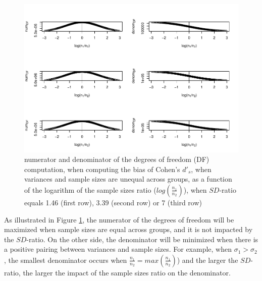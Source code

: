 \documentclass[
  man]{apa6}
\begin{document}
\begin{figure}
\centering
\includegraphics{Theoretical-Bias-of-all-estimators-as-a-function-of-population-parameters_files/figure-latex/biascohendprimehetunbalnumanddenomdf-1.pdf}
\caption{\label{fig:biascohendprimehetunbalnumanddenomdf}numerator and denominator of the degrees of freedom (DF) computation, when computing the bias of Cohen's \(d'_s\), when variances and sample sizes are unequal across groups, as a function of the logarithm of the sample sizes ratio (\(log \left( \frac{n_1}{n_2} \right)\)), when \(SD\)-ratio equals 1.46 (first row), 3.39 (second row) or 7 (third row)}
\end{figure}

As illustrated in Figure \ref{fig:biascohendprimehetunbalnumanddenomdf}, the numerator of the degrees of freedom will be maximized when sample sizes are equal across groups, and it is not impacted by the \(SD\)-ratio. On the other side, the denominator will be minimized when there is a positive pairing between variances and sample sizes. For example, when \(\sigma_1>\sigma_2\), the smallest denominator occurs when \(\frac{n_1}{n_2}=max(\frac{n_1}{n_2})\)) and the larger the \(SD\)-ratio, the larger the impact of the sample sizes ratio on the denominator.
\end{document}
